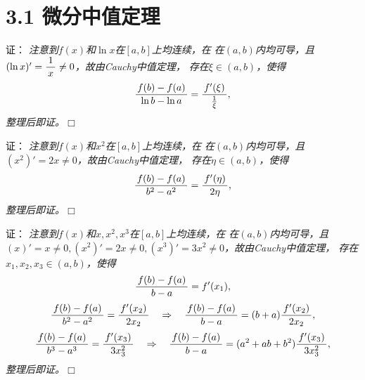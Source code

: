 \section{3.1 微分中值定理}

\begin{frame}
	\linespread{1.5}
	\pause
	
	\bigskip
	
	\small 证：\it
	注意到$f(x)$和$\ln x$在$[a,b]$上均连续，在
	在$(a,b)$内均可导，且$(\ln x)'=\displaystyle\frac{\,{1}\,}{\,{x}\,}\ne 0$，故由Cauchy中值定理，
	存在$\xi\in(a,b)$，使得
	$$\displaystyle\frac{\,{f(b)-f(a)}\,}{\,{\ln b-\ln a}\,}=\displaystyle\frac{\,{f'(\xi)}\,}{\,{\frac1{\xi}}\,},$$
	整理后即证。\hfill$\Box$
\end{frame}

\begin{frame}
	\linespread{1.5}
	\pause
	
	\bigskip
	
	\small 证：\it
	注意到$f(x)$和$x^2$在$[a,b]$上均连续，在
	在$(a,b)$内均可导，且$(x^2)'=2x\ne 0$，故由Cauchy中值定理，
	存在$\eta\in(a,b)$，使得
	$$\displaystyle\frac{\,{f(b)-f(a)}\,}{\,{b^2-a^2}\,}=\displaystyle\frac{\,{f'(\eta)}\,}{\,{2\eta}\,},$$
	整理后即证。\hfill$\Box$
\end{frame}

\begin{frame}
	\linespread{1.5}
	\pause
	
	\bigskip
	
	\small 证：\it
	注意到$f(x)$和$x,x^2,x^3$在$[a,b]$上均连续，在
	在$(a,b)$内均可导，且$(x)'=x\ne 0,(x^2)'=2x\ne 0,
	(x^3)'=3x^2\ne 0$，故由Cauchy中值定理，
	存在$x_1,x_2,x_3\in(a,b)$，使得
	$$\displaystyle\frac{\,{f(b)-f(a)}\,}{\,{b-a}\,}=f'(x_1),$$
	$$\displaystyle\frac{\,{f(b)-f(a)}\,}{\,{b^2-a^2}\,}=\displaystyle\frac{\,{f'(x_2)}\,}{\,{2x_2}\,}
	\quad\Rightarrow\quad
	\displaystyle\frac{\,{f(b)-f(a)}\,}{\,{b-a}\,}=(b+a)\displaystyle\frac{\,{f'(x_2)}\,}{\,{2x_2}\,},$$
	$$\displaystyle\frac{\,{f(b)-f(a)}\,}{\,{b^3-a^3}\,}=\displaystyle\frac{\,{f'(x_3)}\,}{\,{3x_3^2}\,}
	\quad\Rightarrow\quad
	\displaystyle\frac{\,{f(b)-f(a)}\,}{\,{b-a}\,}=(a^2+ab+b^2)\displaystyle\frac{\,{f'(x_3)}\,}{\,{3x_3^2}\,},$$
	整理后即证。\hfill$\Box$
\end{frame}

